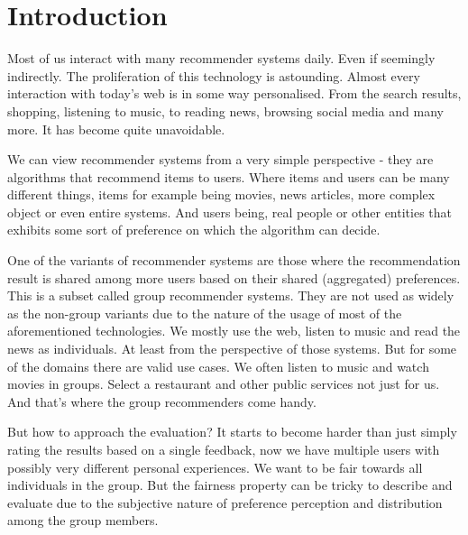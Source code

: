 \chapter{Introduction}  \label{chap_introduction}






Most of us interact with many recommender systems daily. Even if seemingly indirectly. The proliferation of this technology is astounding. Almost every interaction with today's web is in some way personalised. From the search results, shopping, listening to music, to reading news, browsing social media and many more. It has become quite unavoidable.

We can view recommender systems from a very simple perspective - they are algorithms that recommend items to users. Where items and users can be many different things, items for example being movies, news articles, more complex object or even entire systems. And users being, real people or other entities that exhibits some sort of preference on which the algorithm can decide.

One of the variants of recommender systems are those where the recommendation result is shared among more users based on their shared (aggregated) preferences. This is a subset called group recommender systems. They are not used as widely as the non-group variants due to the nature of the usage of most of the aforementioned technologies. We mostly use the web, listen to music and read the news as individuals. At least from the perspective of those systems. But for some of the domains there are valid use cases. We often listen to music and watch movies in groups. Select a restaurant and other public services not just for us. And that's where the group recommenders come handy.

But how to approach the evaluation? It starts to become harder than just simply rating the results based on a single feedback, now we have multiple users with possibly very different personal experiences. We want to be fair towards all individuals in the group. But the fairness property can be tricky to describe and evaluate due to the subjective nature of preference perception and distribution among the group members.

